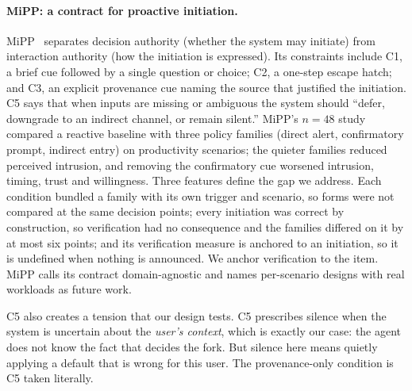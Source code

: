 \documentclass[sigconf,nonacm]{acmart}
\begin{document}
\paragraph{MiPP: a contract for proactive initiation.}
MiPP~\cite{sanchezadame2026} separates decision authority (whether the
system may initiate) from interaction authority (how the initiation is
expressed). Its constraints include C1, a brief cue followed by a single
question or choice; C2, a one-step escape hatch; and C3, an explicit
provenance cue naming the source that justified the initiation. C5 says
that when inputs are missing or ambiguous the system should ``defer,
downgrade to an indirect channel, or remain silent.'' MiPP's $n{=}48$
study compared a reactive baseline with three policy families (direct
alert, confirmatory prompt, indirect entry) on productivity scenarios; the
quieter families reduced perceived intrusion, and removing the
confirmatory cue worsened intrusion, timing, trust and willingness. Three
features define the gap we address. Each condition bundled a family with
its own trigger and scenario, so forms were not compared at the same
decision points; every initiation was correct by construction, so
verification had no consequence and the families differed on it by at most
six points; and its verification measure is anchored to an initiation, so
it is undefined when nothing is announced. We anchor verification to the
item. MiPP calls its contract domain-agnostic and names per-scenario
designs with real workloads as future work.

C5 also creates a tension that our design tests. C5 prescribes silence when
the system is uncertain about the \emph{user's context}, which is exactly
our case: the agent does not know the fact that decides the fork. But
silence here means quietly applying a default that is wrong for this user.
The provenance-only condition is C5 taken literally.
\end{document}
